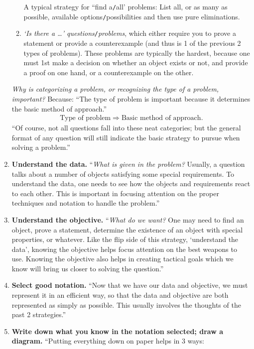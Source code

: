 \documentclass{article}
\numberwithin{equation}{section}
\begin{document}
\begin{enumerate}
\begin{enumerate}
		A typical strategy for ``find a\texttt{/}all' problems: List all, or as many as possible, available options\texttt{/}possibilities and then use pure eliminations.
		\item \textit{`Is there a \ldots' questions}\texttt{/}\textit{problems}, which either require you to prove a statement or provide a counterexample (and thus is 1 of the previous 2 types of problems). These problems are typically the hardest, because one must 1st make a decision on whether an object exists or not, and provide a proof on one hand, or a counterexample on the other.
	\end{enumerate}
	\textit{Why is categorizing a problem, or recognizing the type of a problem, important?} Because: ``The type of problem is important because it determines the basic method of approach.''
	\begin{align*}
		\boxed{\mbox{Type of problem}\Rightarrow\mbox{Basic method of approach}.}
	\end{align*}
	``Of course, not all questions fall into these neat categories; but the general format of any question will still indicate the basic strategy to pursue when solving a problem.''
	\item \textbf{Understand the data.} ``\textit{What is given in the problem?} Usually, a question talks about a number of objects satisfying some special requirements. To understand the data, one needs to see how the objects and requirements react to each other. This is important in focusing attention on the proper techniques and notation to handle the problem.''
	\item \textbf{Understand the objective.} ``\textit{What do we want?} One may need to find an object, prove a statement, determine the existence of an object with special properties, or whatever. Like the flip side of this strategy, `understand the data', knowing the objective helps focus attention on the best weapons to use. Knowing the objective also helps in creating tactical goals which we know will bring us closer to solving the question.''
	\item \textbf{Select good notation.} ``Now that we have our data and objective, we must represent it in an efficient way, so that the data and objective are both represented as simply as possible. This usually involves the thoughts of the past 2 strategies.''
	\item \textbf{Write down what you know in the notation selected; draw a diagram.} ``Putting everything down on paper helps in 3 ways:
	\begin{enumerate}

\end{enumerate}
\end{enumerate}
\end{document}
